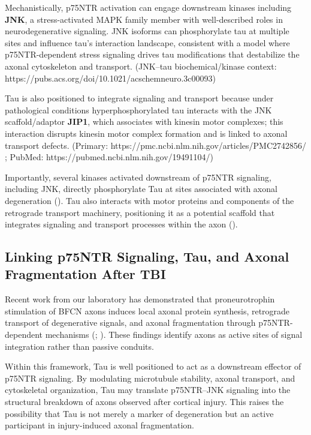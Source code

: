 \documentclass[
  letterpaper,
  DIV=11,
  numbers=noendperiod]{scrreprt}
\begin{document}
Mechanistically, p75NTR activation can engage downstream kinases
including \textbf{JNK}, a stress-activated MAPK family member with
well-described roles in neurodegenerative signaling. JNK isoforms can
phosphorylate tau at multiple sites and influence tau's interaction
landscape, consistent with a model where p75NTR-dependent stress
signaling drives tau modifications that destabilize the axonal
cytoskeleton and transport. (JNK--tau biochemical/kinase context:
https://pubs.acs.org/doi/10.1021/acschemneuro.3c00093)

Tau is also positioned to integrate signaling and transport because
under pathological conditions hyperphosphorylated tau interacts with the
JNK scaffold/adaptor \textbf{JIP1}, which associates with kinesin motor
complexes; this interaction disrupts kinesin motor complex formation and
is linked to axonal transport defects. (Primary:
https://pmc.ncbi.nlm.nih.gov/articles/PMC2742856/ ; PubMed:
https://pubmed.ncbi.nlm.nih.gov/19491104/)

Importantly, several kinases activated downstream of p75NTR signaling,
including JNK, directly phosphorylate Tau at sites associated with
axonal degeneration (). Tau also
interacts with motor proteins and components of the retrograde transport
machinery, positioning it as a potential scaffold that integrates
signaling and transport processes within the axon
().

\subsection{Linking p75NTR Signaling, Tau, and Axonal Fragmentation
After
TBI}\label{linking-p75ntr-signaling-tau-and-axonal-fragmentation-after-tbi}

Recent work from our laboratory has demonstrated that proneurotrophin
stimulation of BFCN axons induces local axonal protein synthesis,
retrograde transport of degenerative signals, and axonal fragmentation
through p75NTR-dependent mechanisms
(; ). These findings identify axons as active sites of signal
integration rather than passive conduits.

Within this framework, Tau is well positioned to act as a downstream
effector of p75NTR signaling. By modulating microtubule stability,
axonal transport, and cytoskeletal organization, Tau may translate
p75NTR--JNK signaling into the structural breakdown of axons observed
after cortical injury. This raises the possibility that Tau is not
merely a marker of degeneration but an active participant in
injury-induced axonal fragmentation.
\end{document}
